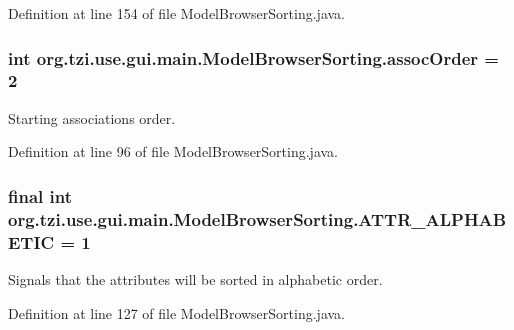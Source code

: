 Definition at line 154 of file Model\-Browser\-Sorting.\-java.

\hypertarget{classorg_1_1tzi_1_1use_1_1gui_1_1main_1_1_model_browser_sorting_abefd9438645b6fe3a7638dcd9cf2ce7f}{
\subsubsection[{assoc\-Order}]{\setlength{\rightskip}{0pt plus 5cm}int org.\-tzi.\-use.\-gui.\-main.\-Model\-Browser\-Sorting.\-assoc\-Order = 2}}\label{classorg_1_1tzi_1_1use_1_1gui_1_1main_1_1_model_browser_sorting_abefd9438645b6fe3a7638dcd9cf2ce7f}
Starting associations order. 

Definition at line 96 of file Model\-Browser\-Sorting.\-java.

\hypertarget{classorg_1_1tzi_1_1use_1_1gui_1_1main_1_1_model_browser_sorting_ac6079183697860abde1efa6831377d43}{
\subsubsection[{A\-T\-T\-R\-\_\-\-A\-L\-P\-H\-A\-B\-E\-T\-I\-C}]{\setlength{\rightskip}{0pt plus 5cm}final int org.\-tzi.\-use.\-gui.\-main.\-Model\-Browser\-Sorting.\-A\-T\-T\-R\-\_\-\-A\-L\-P\-H\-A\-B\-E\-T\-I\-C = 1\hspace{0.3cm}{\ttfamily [static]}}}\label{classorg_1_1tzi_1_1use_1_1gui_1_1main_1_1_model_browser_sorting_ac6079183697860abde1efa6831377d43}
Signals that the attributes will be sorted in alphabetic order. 

Definition at line 127 of file Model\-Browser\-Sorting.\-java.

